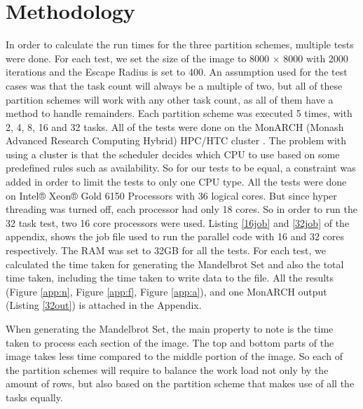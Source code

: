 \documentclass[conference]{IEEEtran}
\begin{document}
	\section{Methodology}
	 \label{TEST}
	In order to calculate the run times for the three partition schemes, multiple tests were done. For each test, we set the size of the image to 8000 $\times$ 8000 with 2000 iterations and the Escape Radius is set to 400. An assumption used for the test cases was that the task count will always be a multiple of two, but all of these partition schemes will work with any other task count, as all of them have a method to handle remainders. Each partition scheme was executed 5 times, with 2, 4, 8, 16 and 32 tasks. \newline
	All of the tests were done on the MonARCH (Monash Advanced Research Computing Hybrid) HPC/HTC cluster \cite{mon}. The problem with using a cluster is that the scheduler decides which CPU to use based on some predefined rules such as availability. So for our tests to be equal, a constraint was added in order to limit the tests to only one CPU type. All the tests were done on Intel® Xeon® Gold 6150 Processors with 36 logical cores. But since hyper threading was turned off, each processor had only 18 cores. So in order to run the 32 task test, two 16 core processors were used. Listing \ref{16job} and \ref{32job} of the appendix, shows the job file used to run the parallel code with 16 and 32 cores respectively. The RAM was set to 32GB for all the tests. \newline
	For each test, we calculated the time taken for generating the Mandelbrot Set and also the total time taken, including the time taken to write data to the file. All the results (Figure \ref{app:n}, Figure \ref{app:f}, Figure \ref{app:a}), and one MonARCH output (Listing \ref{32out}) is attached in the Appendix. 
	
	When generating the Mandelbrot Set, the main property to note is the time taken to process each section of the image. The top and bottom parts of the image takes less time compared to the middle portion of the image. So each of the partition schemes will require to balance the work load not only by the amount of rows, but also based on the partition scheme that makes use of all the tasks equally.
\end{document}
